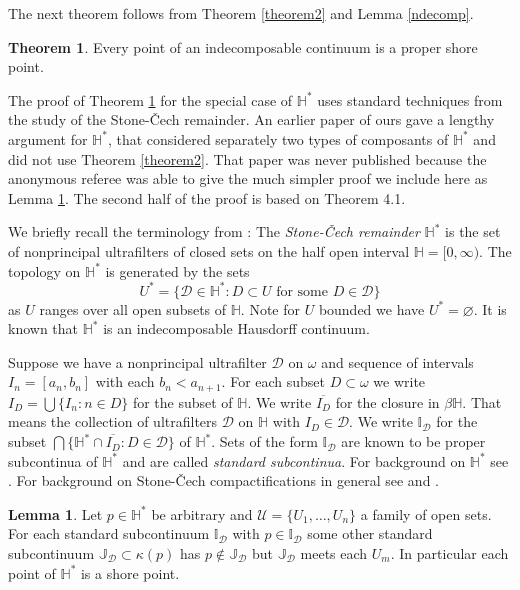 \documentclass[12pt]{article}
\theoremstyle{plain}
\theoremstyle{definition}
\newtheorem{lemma}[theorem]{Lemma}
\newcounter{dummy}
\newcounter{dummy4}
\newcounter{dummy3}
\newtheorem{thm3}[dummy3]{Theorem}
\newcounter{dummy5}
\newcounter{dummy6}
\newcommand{\K}{\ensuremath{\kappa}}
\newcommand{\W}{\ensuremath{\omega}}
\newcommand{\II}{\ensuremath{\mathbb I}}
\newcommand{\JJ}{\ensuremath{\mathbb J}}
\newcommand{\HH}{\ensuremath{\mathbb H}}
\newcommand{\0}{\ensuremath{\varnothing}}
\newcommand{\cD}{\ensuremath{\mathcal D}}
\newcommand{\cU}{\ensuremath{\mathcal U}}
\begin{document}
The next theorem follows from Theorem \ref{theorem2} and Lemma \ref{ndecomp}.

\begin{thm3}\label{indsp}
Every point of an indecomposable continuum is a proper shore point.
\end{thm3}

The proof of Theorem \ref{indsp} for the special case of $\HH^*$ uses standard techniques from the study of the Stone-\v Cech remainder.
An earlier paper of ours gave a lengthy argument for $\HH^*$, that considered separately two types of composants of $\HH^*$ and did not use Theorem \ref{theorem2}.
That paper was never published because the anonymous referee was able to give the much simpler proof we include here as Lemma \ref{Anon}. The second half of the proof is based on \cite{NCF2} Theorem 4.1.

We briefly recall the terminology from \cite{Me2}:
The {\it Stone-\v Cech remainder} $\HH^*$ is the set of nonprincipal ultrafilters of closed sets on the half open interval $\HH = [0, \infty)$. The topology on $\HH^*$ is generated by the sets $$U^* = \{\cD \in \HH^*: D \subset U\text{ for some }D \in \cD\}$$ as $U$ ranges over all open subsets of $\HH$. Note for $U$ bounded we have $U^* = \0$.
It is known that $\HH^*$ is an indecomposable Hausdorff continuum.

Suppose we have a nonprincipal ultrafilter $\cD$ on $\W$ and sequence of intervals $I_n = [a_n,b_n]$ with each $b_n < a_{n+1}$. For each subset $D \subset \W$ we write $I_D = \bigcup\{I_n:n \in D\}$ for the subset of $\HH$. We write $\overline {I_D}$ for the closure in $\beta \HH$. That means the collection of ultrafilters $\cD$ on $\HH$ with $I_D \in \cD$. We write $\II_\cD$ for the subset $ \bigcap \big \{\HH^* \cap \overline{I_D} : D \in \cD \big \}$ of $\HH^*$. Sets of the form $\II_\cD$ are known to be proper subcontinua of $\HH^*$ and are called {\it standard subcontinua}. For background on $\HH^*$ see \cite{CS1}. For background on Stone-\v Cech compactifications in general see \cite{uff} and \cite{CSbook}. 

\begin{lemma}\label{Anon}
Let $p \in \HH^*$ be arbitrary and $\cU = \{U_1, \ldots, U_n\}$ a family of open sets.
For each standard subcontinuum $\II_\cD$ with $p \in \II_\cD$ some other standard subcontinuum $\JJ_\cD \subset \K(p)$
has $p \notin \JJ_\cD$ but $\JJ_\cD$ meets each $U_m$.
In particular each point of $\HH^*$ is a shore point.
\end{lemma}
\end{document}
